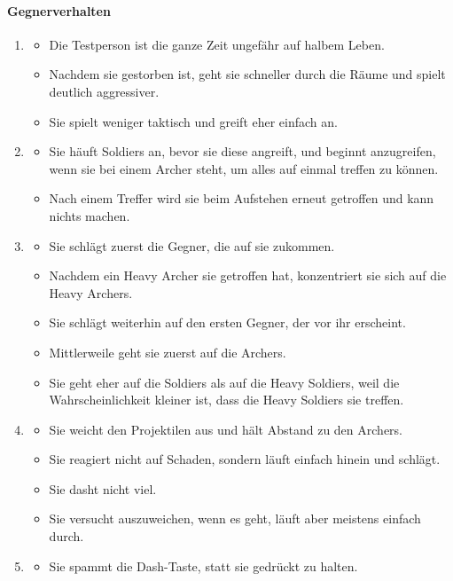 \documentclass[../Main.tex]{subfiles}
\begin{document}
\paragraph{Gegnerverhalten}
\begin{enumerate}[label=\textbf{B\arabic*}, leftmargin=1.5cm, itemsep=0.8em]
\item
\begin{itemize}[nosep]
\item Die Testperson ist die ganze Zeit ungefähr auf halbem Leben.
\item Nachdem sie gestorben ist, geht sie schneller durch die Räume und spielt deutlich aggressiver.
\item Sie spielt weniger taktisch und greift eher einfach an.
\end{itemize}
\item
\begin{itemize}[nosep]
\item Sie häuft Soldiers an, bevor sie diese angreift, und beginnt anzugreifen, wenn sie bei einem Archer steht, um alles auf einmal treffen zu können.
\item Nach einem Treffer wird sie beim Aufstehen erneut getroffen und kann nichts machen.
\end{itemize}
\item
\begin{itemize}[nosep]
\item Sie schlägt zuerst die Gegner, die auf sie zukommen.
\item Nachdem ein Heavy Archer sie getroffen hat, konzentriert sie sich auf die Heavy Archers.
\item Sie schlägt weiterhin auf den ersten Gegner, der vor ihr erscheint.
\item Mittlerweile geht sie zuerst auf die Archers.
\item Sie geht eher auf die Soldiers als auf die Heavy Soldiers, weil die Wahrscheinlichkeit kleiner ist, dass die Heavy Soldiers sie treffen.
\end{itemize}
\item
\begin{itemize}[nosep]
\item Sie weicht den Projektilen aus und hält Abstand zu den Archers.
\item Sie reagiert nicht auf Schaden, sondern läuft einfach hinein und schlägt.
\item Sie dasht nicht viel.
\item Sie versucht auszuweichen, wenn es geht, läuft aber meistens einfach durch.
\end{itemize}
\item
\begin{itemize}[nosep]
\item Sie spammt die Dash-Taste, statt sie gedrückt zu halten.
\end{itemize}
\end{enumerate}
\end{document}
